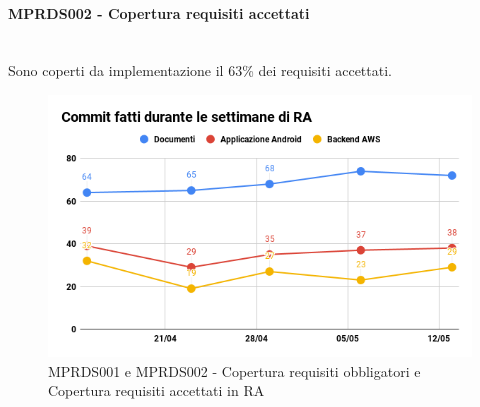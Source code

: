 \paragraph{MPRDS002 - Copertura requisiti accettati}\mbox{}\\[0.4cm]
Sono coperti da implementazione il 63\% dei requisiti accettati.
\begin{figure}[H]
	\centering
	\includegraphics[width=13cm,keepaspectratio]{../includes/pics/CoperturaRA.png}
	\caption{\label{fig:mission}MPRDS001 e MPRDS002 - Copertura requisiti obbligatori e Copertura requisiti accettati in RA}
\end{figure}
